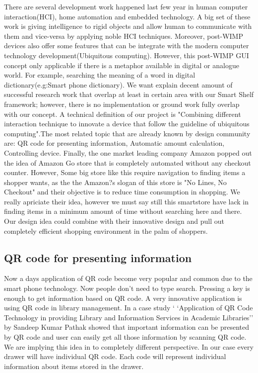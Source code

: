 There are several development work happened last few year in human computer interaction(HCI), home automation and embedded technology. A big set of these work is giving intelligence to rigid objects and allow human to communicate with them and vice-versa by applying noble HCI techniques. Moreover, post-WIMP devices also offer some features that can be integrate with the modern computer technology development(Ubiquitous computing). However, this post-WIMP GUI concept only applicable if there is a metaphor available in digital or analogue world. For example, searching the meaning of a word in digital dictionary(e.g:Smart phone dictionary). We want explain decent amount of successful research work that overlap at least in certain area with our Smart Shelf framework; however, there is no implementation or ground work fully overlap with our concept. A technical definition of our project is "Combining different interaction technique to innovate a device that follow the guideline of ubiquitous computing".The most related topic that are already known by design community are: QR code for presenting information, Automatic amount calculation, Controlling device. Finally, the one market leading company Amazon popped out the idea of   Amazon Go store that is completely automated without any checkout counter. However, Some big store like this require navigation to finding items a shopper wants, as the the Amazon?s slogan of this store is "No Lines, No Checkout" and their objective is to reduce time consumption in shopping. We really apriciate their idea, however we must say still this smartstore have lack in finding items in a minimum amount of time without searching here and there. Our design idea could combine with their innovative design and pull out completely efficient shopping environment in the palm of shoppers.  
\subsection{QR code for presenting information} 
Now a days application of QR code become very popular and common due to the smart phone technology. Now people don't need to type search. Pressing a key is enough to get information based on QR code. A very innovative application is using QR code in library management. In a case study ` `Application of QR Code Technology in providing Library and Information Services in Academic Libraries'' by  Sandeep
Kumar Pathak showed that important information can be presented by QR code and user can easily get all those information by scanning QR code. 
We are implying this idea in to completely different perspective. In our case every drawer will have individual QR code. Each code will represent individual information about items stored in the drawer. 
